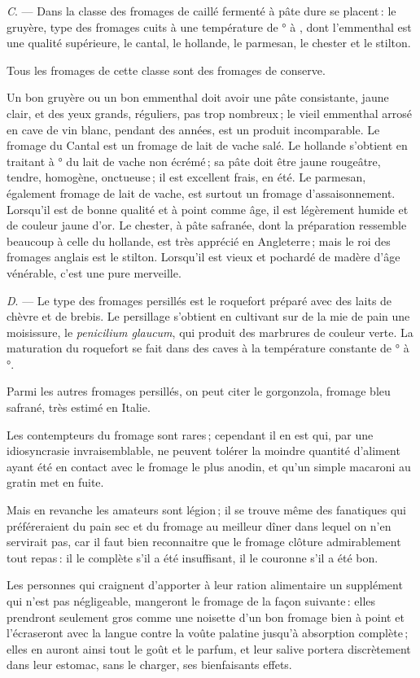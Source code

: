 \medskip

\textit{C}. — Dans la classe des fromages de caillé fermenté à pâte dure se
placent : le gruyère, type des fromages cuits à une température de
{\mmm}° à {\mmm}, dont l'emmenthal est une qualité supérieure, le
cantal, le hollande, le parmesan, le chester et le stilton.

Tous les fromages de cette classe sont des fromages de conserve.

Un bon gruyère ou un bon emmenthal doit avoir une pâte consistante, jaune
clair, et des yeux grands, réguliers, pas trop nombreux ; le vieil emmenthal
arrosé en cave de vin blanc, pendant des années, est un produit incomparable.
Le fromage du Cantal est un fromage de lait de vache salé. Le hollande
s'obtient en traitant à {\mmm}° du lait de vache non écrémé ; sa pâte
doit être jaune rougeâtre, tendre, homogène, onctueuse ; il est excellent
frais, en été. Le parmesan, également fromage de lait de vache, est surtout un
fromage d’assaisonnement. Lorsqu'il est de bonne qualité et à point comme âge,
il est légèrement humide et de couleur jaune d'or. Le chester, à pâte safranée,
dont la préparation ressemble beaucoup à celle du hollande, est très apprécié
en Angleterre ; mais le roi des fromages anglais est le stilton. Lorsqu'il est
vieux et pochardé de madère d'âge vénérable, c'est une pure merveille.

\medskip

\textit{D}. — Le type des fromages persillés est le roquefort préparé avec des
laits de chèvre et de brebis. Le persillage s'obtient en cultivant sur de la
mie de pain une moisissure, le \textit{penicilium glaucum}, qui produit des
marbrures de couleur verte. La maturation du roquefort se fait dans des caves
à la température constante de {\mmm}° à {\mmm}°.

Parmi les autres fromages persillés, on peut citer le gorgonzola, fromage bleu
safrané, très estimé en Italie.

\sk

Les contempteurs du fromage sont rares ; cependant il en est qui, par une
idiosyncrasie invraisemblable, ne peuvent tolérer la moindre quantité d'aliment
ayant été en contact avec le fromage le plus anodin, et qu'un simple macaroni
au gratin met en fuite.

\medskip

Mais en revanche les amateurs sont légion ; il se trouve même des fanatiques
qui préféreraient du pain sec et du fromage au meilleur dîner dans lequel on
n'en servirait pas, car il faut bien reconnaitre que le fromage clôture
admirablement tout repas : il le complète s'il a été insuffisant, il le
couronne s'il a été bon.

\sk

Les personnes qui craignent d'apporter à leur ration alimentaire un supplément
qui n'est pas négligeable, mangeront le fromage de la façon suivante : elles
prendront seulement gros comme une noisette d’un bon fromage bien à point et
l'écraseront avec la langue contre la voûte palatine jusqu'à absorption
complète ; elles en auront ainsi tout le goût et le parfum, et leur salive
portera discrètement dans leur estomac, sans le charger, ses bienfaisants
effets.
